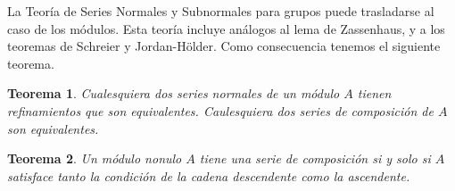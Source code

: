 \documentclass{report}
\newtheorem{theorem}{Teorema}
\begin{document}
  La Teoría de Series Normales y Subnormales para grupos puede trasladarse al caso de los módulos.
  Esta teoría incluye análogos al lema de Zassenhaus, y a los teoremas de Schreier y Jordan-Hölder.
  Como consecuencia tenemos el siguiente teorema.
  \begin{theorem}\label{theorem:refinementAndEquivalenceOfNormalSeries}
    Cualesquiera dos series normales de un módulo \(A\) tienen refinamientos que son equivalentes.
    Caulesquiera dos series de composición de \(A\) son equivalentes.
  \end{theorem}


  \begin{theorem}\label{theorem:compositionSeriesAndChainConditions}
    Un módulo nonulo \(A\) tiene una serie de composición si y solo si \(A\) satisface tanto la condición de la cadena descendente como la ascendente.
  \end{theorem}
\end{document}
